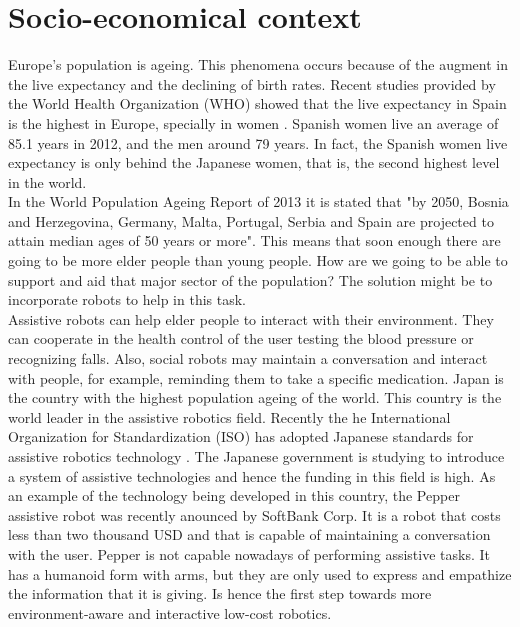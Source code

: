 \section{Socio-economical context}
\label{context}
Europe's population is ageing.
This phenomena occurs because of the augment in the live expectancy and the declining of birth rates. 
Recent studies provided by the World Health Organization (WHO) showed that the live expectancy in Spain is the highest in Europe, specially in women \cite{who_live_expectancy}.
Spanish women live an average of  85.1 years in 2012, and the men around 79 years. 
In fact, the Spanish women live expectancy is only behind the Japanese women, that is, the second highest level in the world. 
\\

In the World Population Ageing Report of 2013 it is stated that "by 2050, Bosnia and
Herzegovina, Germany, Malta, Portugal, Serbia and Spain are projected to attain median ages of
50 years or more"\cite{world_population_ageing}. 
This means that soon enough there are going to be more elder people than young people. 
How are we going to be able to support and aid that major sector of the population?
The solution might be to incorporate robots to help in this task. 
\\

Assistive robots can help elder people to interact with their environment. 
They can cooperate in the health control of the user testing the blood pressure or recognizing falls. 
Also, social robots may maintain a conversation and interact with people, for example, reminding them to take a specific medication. 
Japan is the country with the highest population ageing of the world. 
This country is the world leader in the assistive robotics field. 
Recently the he International Organization for Standardization (ISO) has adopted Japanese standards for assistive robotics technology \cite{japan1}\cite{japan2}.
The Japanese government is studying to introduce a system of assistive technologies and hence the funding in this field is high. 
As an example of the technology being developed in this country, the Pepper assistive robot was recently anounced by SoftBank Corp\cite{cheap_humanoid}.
It is a robot that costs less than two thousand USD and that is capable of maintaining a conversation with the user. 
Pepper is not capable nowadays of performing assistive tasks. 
It has a humanoid form with arms, but they are only used to express and empathize the information that it is giving. 
Is hence the first step towards more environment-aware and interactive low-cost robotics.
\\

